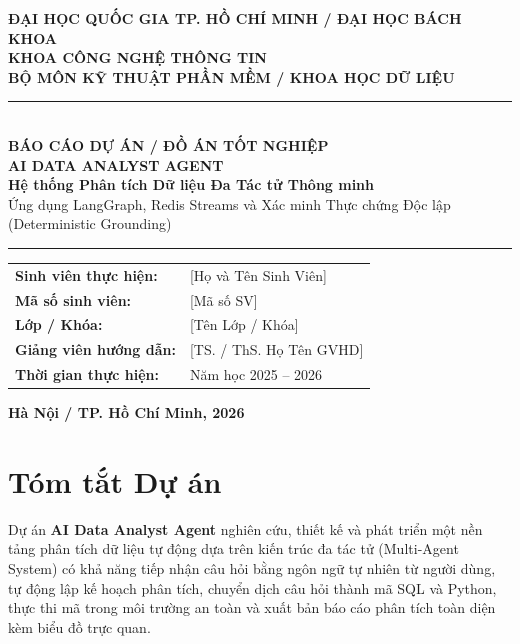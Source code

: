 \documentclass[12pt, a4paper]{article}
\begin{document}
\begin{titlepage}
    \centering
    \vspace*{1.5cm}

    {\Large \textbf{ĐẠI HỌC QUỐC GIA TP. HỒ CHÍ MINH / ĐẠI HỌC BÁCH KHOA}}\\[0.4cm]
    {\large \textbf{KHOA CÔNG NGHỆ THÔNG TIN}}\\[0.2cm]
    {\large \textbf{BỘ MÔN KỸ THUẬT PHẦN MỀM / KHOA HỌC DỮ LIỆU}}\\[1.5cm]

    \rule{\textwidth}{1.5pt}\\[0.5cm]
    {\LARGE \textbf{BÁO CÁO DỰ ÁN / ĐỒ ÁN TỐT NGHIỆP}}\\[0.4cm]
    {\Huge \textbf{AI DATA ANALYST AGENT}}\\[0.3cm]
    {\Large \textbf{Hệ thống Phân tích Dữ liệu Đa Tác tử Thông minh}}\\[0.2cm]
    {\large Ứng dụng LangGraph, Redis Streams và Xác minh Thực chứng Độc lập (Deterministic Grounding)}\\[0.5cm]
    \rule{\textwidth}{1.5pt}

    \vspace{2cm}

    \begin{flushleft}
        \large
        \begin{tabular}{ll}
            \textbf{Sinh viên thực hiện:} & [Họ và Tên Sinh Viên] \\
            \textbf{Mã số sinh viên:}     & [Mã số SV] \\
            \textbf{Lớp / Khóa:}          & [Tên Lớp / Khóa] \\
            \textbf{Giảng viên hướng dẫn:} & [TS. / ThS. Họ Tên GVHD] \\
            \textbf{Thời gian thực hiện:} & Năm học 2025 -- 2026 \\
        \end{tabular}
    \end{flushleft}

    \vfill
    {\large \textbf{Hà Nội / TP. Hồ Chí Minh, 2026}}
\end{titlepage}

\section*{Tóm tắt Dự án}

Dự án \textbf{AI Data Analyst Agent} nghiên cứu, thiết kế và phát triển một nền tảng phân tích dữ liệu tự động dựa trên kiến trúc đa tác tử (Multi-Agent System) có khả năng tiếp nhận câu hỏi bằng ngôn ngữ tự nhiên từ người dùng, tự động lập kế hoạch phân tích, chuyển dịch câu hỏi thành mã SQL và Python, thực thi mã trong môi trường an toàn và xuất bản báo cáo phân tích toàn diện kèm biểu đồ trực quan.
\end{document}
